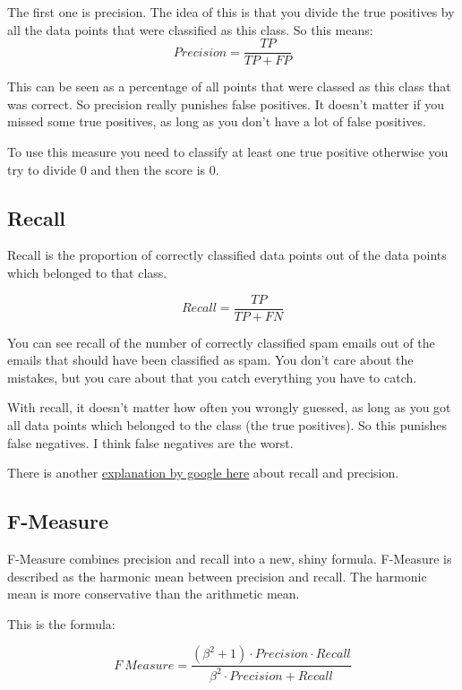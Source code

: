 \documentclass[
  11pt,
  british,
]{article}
\begin{document}
The first one is precision. The idea of this is that you divide the true
positives by all the data points that were classified as this class. So
this means: \[Precision = \frac{TP}{TP+FP}\]

This can be seen as a percentage of all points that were classed as this
class that was correct. So precision really punishes false positives. It
doesn't matter if you missed some true positives, as long as you don't
have a lot of false positives.

To use this measure you need to classify at least one true positive
otherwise you try to divide 0 and then the score is 0.

\hypertarget{recall}{%
\subsection{Recall}\label{recall}}

Recall is the proportion of correctly classified data points out of the
data points which belonged to that class.

\[Recall = \frac{TP}{TP+FN}\]

You can see recall of the number of correctly classified spam emails out
of the emails that should have been classified as spam. You don't care
about the mistakes, but you care about that you catch everything you
have to catch.

With recall, it doesn't matter how often you wrongly guessed, as long as
you got all data points which belonged to the class (the true
positives). So this punishes false negatives. I think false negatives
are the worst.

There is another
\href{https://developers.google.com/machine-learning/crash-course/classification/precision-and-recall}{explanation
by google here} about recall and precision.

\hypertarget{f-measure}{%
\subsection{F-Measure}\label{f-measure}}

F-Measure combines precision and recall into a new, shiny formula.
F-Measure is described as the harmonic mean between precision and
recall. The harmonic mean is more conservative than the arithmetic mean.

This is the formula:

\[F~Measure = \frac{(β^{2} + 1) \cdot Precision \cdot Recall}{β^{2}  \cdot Precision + Recall}\]
\end{document}
